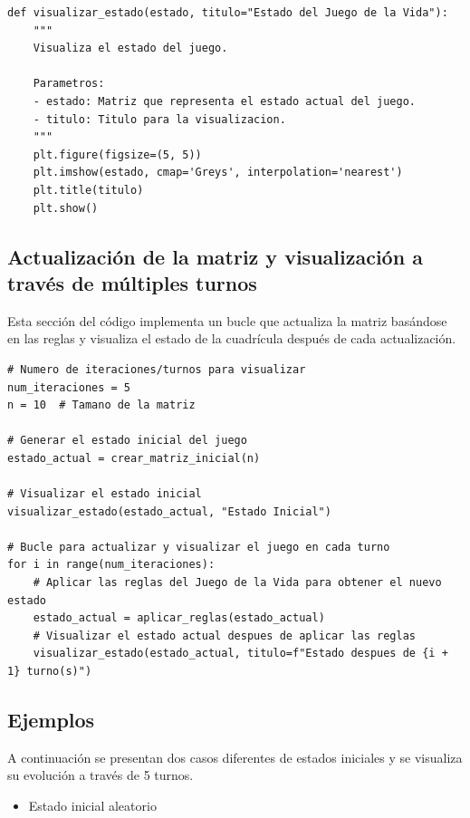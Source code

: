 \begin{enumerate}
\begin{lstlisting}
def visualizar_estado(estado, titulo="Estado del Juego de la Vida"):
    """
    Visualiza el estado del juego.
    
    Parametros:
    - estado: Matriz que representa el estado actual del juego.
    - titulo: Titulo para la visualizacion.
    """
    plt.figure(figsize=(5, 5))
    plt.imshow(estado, cmap='Greys', interpolation='nearest')
    plt.title(titulo)
    plt.show()
\end{lstlisting}

\subsection{Actualización de la matriz y visualización a través de múltiples turnos}

Esta sección del código implementa un bucle que actualiza la matriz basándose en las reglas y visualiza el estado de la cuadrícula después de cada actualización.

\begin{lstlisting}
# Numero de iteraciones/turnos para visualizar
num_iteraciones = 5
n = 10  # Tamano de la matriz

# Generar el estado inicial del juego
estado_actual = crear_matriz_inicial(n)

# Visualizar el estado inicial
visualizar_estado(estado_actual, "Estado Inicial")

# Bucle para actualizar y visualizar el juego en cada turno
for i in range(num_iteraciones):
    # Aplicar las reglas del Juego de la Vida para obtener el nuevo estado
    estado_actual = aplicar_reglas(estado_actual)
    # Visualizar el estado actual despues de aplicar las reglas
    visualizar_estado(estado_actual, titulo=f"Estado despues de {i + 1} turno(s)")
\end{lstlisting}



\subsection{Ejemplos}

A continuación se presentan dos casos diferentes de estados iniciales y se visualiza su evolución a través de 5 turnos.

\begin{itemize}
    \item Estado inicial aleatorio\\


\end{itemize}
\end{enumerate}
